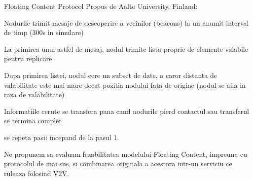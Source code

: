 \documentclass{beamer}
\begin{document}
\begin{frame}{Floating Content Protocol}
	Propus de Aalto University, Finland:
	\begin{enumerate}{\fontsize{8}{12}\selectfont
	  \item Nodurile trimit mesaje de descoperire a vecinilor (beacons) la un
	  anumit interval de timp (300s in simulare)
	  \item La primirea unui astfel de mesaj, nodul trimite lista proprie de
	  elemente valabile pentru replicare
	  \item Dupa primirea listei, nodul cere un subset de date, a caror distanta de
	  valabilitate este mai mare decat pozitia nodului fata de origine (nodul se
	  afla in raza de valabilitate)
	  \item Informatiile cerute se transfera pana cand nodurile pierd contactul sau
	  transferul se termina complet
	  \item se repeta pasii incepand de la pasul 1.}
	\end{enumerate}
	Ne propunem sa evaluam fezabilitatea modelului Floating Content,
	impreuna cu protocolul de mai sus, si combinarea originala a acestora
	intr-un serviciu ce ruleaza folosind V2V.
\end{frame}
\end{document}
